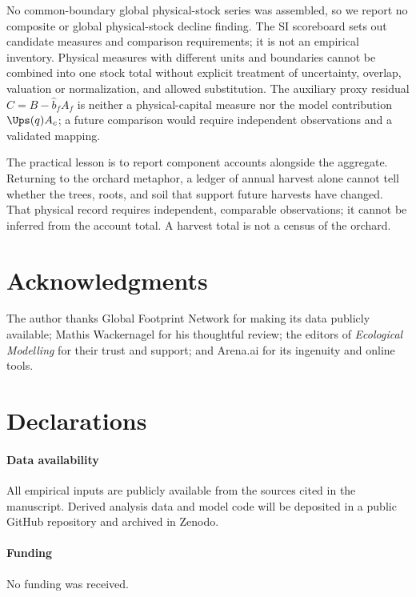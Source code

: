 \begin{samepage}
No common-boundary global physical-stock series was assembled, so we report no composite or global physical-stock decline finding. The SI scoreboard sets out candidate measures and comparison requirements; it is not an empirical inventory. Physical measures with different units and boundaries cannot be combined into one stock total without explicit treatment of uncertainty, overlap, valuation or normalization, and allowed substitution. The auxiliary proxy residual $C=B-\hat b_fA_f$ is neither a physical-capital measure nor the model contribution $\Ups(q)A_c$; a future comparison would require independent observations and a validated mapping.\par
\end{samepage}

The practical lesson is to report component accounts alongside the aggregate. Returning to the orchard metaphor, a ledger of annual harvest alone cannot tell whether the trees, roots, and soil that support future harvests have changed. That physical record requires independent, comparable observations; it cannot be inferred from the account total. A harvest total is not a census of the orchard.

\section*{Acknowledgments}

The author thanks Global Footprint Network for making its data publicly available; Mathis Wackernagel for his thoughtful review; the editors of \emph{Ecological Modelling} for their trust and support; and Arena.ai for its ingenuity and online tools.

\section*{Declarations}

\paragraph{Data availability} All empirical inputs are publicly available from the sources cited in the manuscript. Derived analysis data and model code will be deposited in a public GitHub repository and archived in Zenodo.

\paragraph{Funding} No funding was received.

